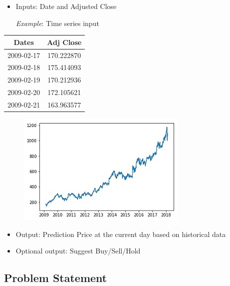\documentclass[11pt]{article}
\makeatletter
\def\maxwidth{\ifdim\Gin@nat@width>\linewidth\linewidth
    \else\Gin@nat@width\fi}
\let\Oldincludegraphics\includegraphics
\renewcommand{\includegraphics}[1]{\Oldincludegraphics[width=.8\maxwidth]{#1}}
\providecommand{\tightlist}{%
      \setlength{\itemsep}{0pt}\setlength{\parskip}{0pt}}
\makeatother
\begin{document}
\begin{itemize}
\item
  Inputs: Date and Adjusted Close

  \emph{Example}: Time series input
\end{itemize}

\begin{longtable}[]{@{}cc@{}}
\toprule
\textbf{Dates} & \textbf{Adj Close}\tabularnewline
\midrule
\endhead
2009-02-17 & 170.222870\tabularnewline
2009-02-18 & 175.414093\tabularnewline
2009-02-19 & 170.212936\tabularnewline
2009-02-20 & 172.105621\tabularnewline
2009-02-21 & 163.963577\tabularnewline
\bottomrule
\end{longtable}

\begin{figure}
\centering
\includegraphics{./figures/1.jpg}
\caption{}
\end{figure}

\begin{itemize}
\tightlist
\item
  Output: Prediction Price at the current day based on historical data
\item
  Optional output: Suggest Buy/Sell/Hold
\end{itemize}

\subsection{Problem Statement}\label{problem-statement}
\end{document}
